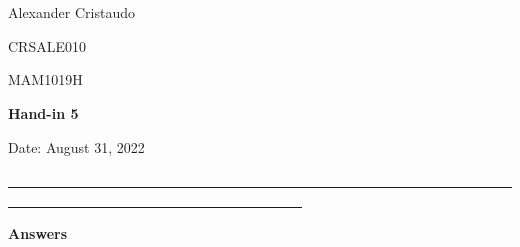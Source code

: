 \documentclass[12pt, a4paper]{exam}
\begin{document}
	\noindent
	\begin{minipage}[l]{0.1\textwidth}
		\noindent
	\end{minipage}
\hfill
\begin{minipage}[c]{1.0\textwidth} %
	\begin{center}
		
		{
		\large \ \ \par
		\large \ \ \par
		\large  Alexander Cristaudo \par
		\small	CRSALE010	\par
		\large	MAM1019H 	\par
	\large \textbf{Hand-in 5}	\par
\small	Date: August 31, 2022}
	\end{center}
\end{minipage}
\par
\vspace{0.2in}
\noindent
\uline{ \ \ \ \ \ \ \ \ \ \ \ \ \ \ \ \ \ \ \ \ \ \ \ \ \ \ \ \ \ \ \ \ \ \ \ \ \ \ \ \ \ \ \ \ \ \ \ \ \ \ \ \ \ \ \ \ \ \ \ \ \ \ \ \ \ \ \ \ \ \ \ \ \ \ \ \ \ \  \ \ \ \ \ \ \ \ \ \ \ \ \ \  \ \ \ \ \ \ \ \ \ \ \ \ \ \ \ \ \ \ \ \ \ \ }
\par 
\vspace{0.15in}
\noindent
\centering
{\small \bfseries 	Answers}
\end{document}
